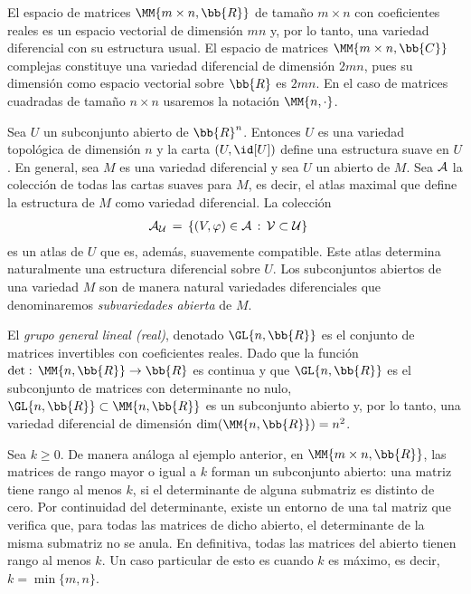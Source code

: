 \begin{ejemplo}
	El espacio de matrices $\MM{m\times n,\bb{R}}$ de tama\~{n}o
	$m\times n$ con coeficientes reales es un espacio vectorial de
	dimensi\'{o}n $mn$ y, por lo tanto, una variedad diferencial con
	su estructura usual. El espacio de matrices $\MM{m\times n,\bb{C}}$
	complejas constituye una variedad diferencial de dimensi\'{o}n $2mn$,
	pues su dimensi\'{o}n como espacio vectorial sobre $\bb{R}$ es $2mn$.
	En el caso de matrices cuadradas de tama\~{n}o $n\times n$ usaremos
	la notaci\'{o}n $\MM{n,\cdot}$.
\end{ejemplo}

\begin{ejemplo}
	Sea $U$ un subconjunto abierto de $\bb{R}^{n}$. Entonces $U$ es una
	variedad topol\'{o}gica de dimensi\'{o}n $n$ y la carta
	$(U,\id[U])$ define una estructura suave en $U$. En general, sea
	$M$ es una variedad diferencial y sea $U$ un abierto de $M$.
	Sea $\cal{A}$ la colecci\'{o}n de todas las cartas suaves para
	$M$, es decir, el atlas maximal que define la estructura de $M$
	como variedad diferencial. La colecci\'{o}n
	\begin{align*}
		\cal{A}_{U} & \,=\,\left\lbrace
			(V,\varphi)\in\cal{A}\,:\,V\subset U\right\rbrace
	\end{align*}
	es un atlas de $U$ que es, adem\'{a}s, suavemente compatible.
	Este atlas determina naturalmente una estructura diferencial
	sobre $U$. Los subconjuntos abiertos de una variedad $M$ son
	de manera natural variedades diferenciales que denominaremos
	\emph{subvariedades abierta} de $M$.
\end{ejemplo}

\begin{ejemplo}
	El \emph{grupo general lineal (real)}, denotado $\GL{n,\bb{R}}$
	es el conjunto de matrices invertibles con coeficientes reales.
	Dado que la funci\'{o}n $\det:\,\MM{n,\bb{R}}\rightarrow\bb{R}$
	es continua y que $\GL{n,\bb{R}}$ es el subconjunto de matrices
	con determinante no nulo, $\GL{n,\bb{R}}\subset\MM{n,\bb{R}}$ es
	un subconjunto abierto y, por lo tanto, una variedad diferencial
	de dimensi\'{o}n $\dim(\MM{n,\bb{R}})=n^{2}$.
\end{ejemplo}

\begin{ejemplo}
	Sea $k\geq 0$. De manera an\'{a}loga al ejemplo anterior, en
	$\MM{m\times n,\bb{R}}$, las matrices de rango mayor o igual a $k$
	forman un subconjunto abierto: una matriz tiene rango al menos $k$,
	si el determinante de alguna submatriz es distinto de cero. Por
	continuidad del determinante, existe un entorno de una tal matriz
	que verifica que, para todas las matrices de dicho abierto, el
	determinante de la misma submatriz no se anula. En definitiva, todas
	las matrices del abierto tienen rango al menos $k$. Un caso particular
	de esto es cuando $k$ es m\'{a}ximo, es decir, $k=\min\{m,n\}$.
\end{ejemplo}

